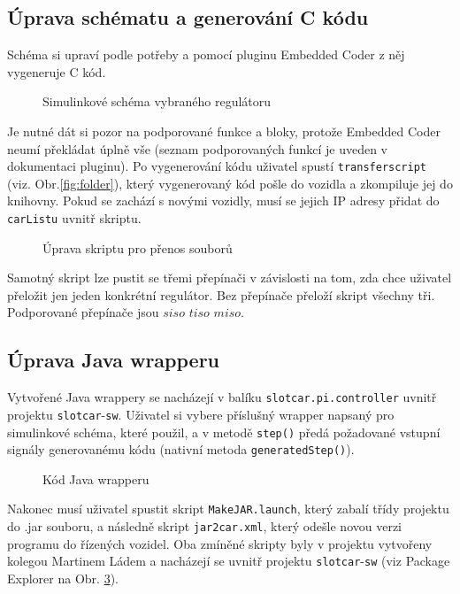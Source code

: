 \documentclass[thesis=M,czech,hidelinks]{FITthesis}[2012/06/26]
\begin{document}
\subsection{Úprava schématu a generování C kódu}
Schéma si upraví podle potřeby a pomocí pluginu Embedded Coder z něj vygeneruje C kód.
\begin{figure}[h]
        \centering
        \caption{Simulinkové schéma vybraného regulátoru}
        \label{fig:tutsim}
\end{figure}

Je nutné dát si pozor na podporované funkce a bloky, protože Embedded Coder neumí překládat úplně vše (seznam podporovaných funkcí je uveden v dokumentaci pluginu\cite{doc}). Po vygenerování kódu uživatel spustí \texttt{transferscript} (viz. Obr.\ref{fig:folder}), který vygenerovaný kód pošle do vozidla a zkompiluje jej do knihovny. Pokud se zachází s novými vozidly, musí se jejich IP adresy přidat do \texttt{carListu} uvnitř skriptu.
\begin{figure}[h]
        \centering
        \caption{Úprava skriptu pro přenos souborů}
        \label{fig:tutsim}
\end{figure}

Samotný skript lze pustit se třemi přepínači v závislosti na tom, zda chce uživatel přeložit jen jeden konkrétní regulátor. Bez přepínače přeloží skript všechny tři. Podporované přepínače jsou $siso$ $tiso$ $miso$.

\subsection{Úprava Java wrapperu}
Vytvořené Java wrappery se nacházejí v balíku \texttt{slotcar.pi.controller} uvnitř projektu \texttt{slotcar}-\texttt{sw}. Uživatel si vybere příslušný wrapper napsaný pro simulinkové schéma, které použil, a v metodě \texttt{step()} předá požadované vstupní signály generovanému kódu (nativní metoda \texttt{generatedStep()}).
\begin{figure}[h]
        \centering
        \caption{Kód Java wrapperu}
        \label{fig:tutecl}
\end{figure}

Nakonec musí uživatel spustit skript \texttt{MakeJAR.launch}, který zabalí třídy projektu do .jar souboru, a následně skript \texttt{jar2car.xml}, který odešle novou verzi programu do řízených vozidel. Oba zmíněné skripty byly v projektu vytvořeny kolegou Martinem Ládem a nacházejí se uvnitř projektu \texttt{slotcar}-\texttt{sw} (viz Package Explorer na Obr. \ref{fig:tutecl}).
\end{document}
